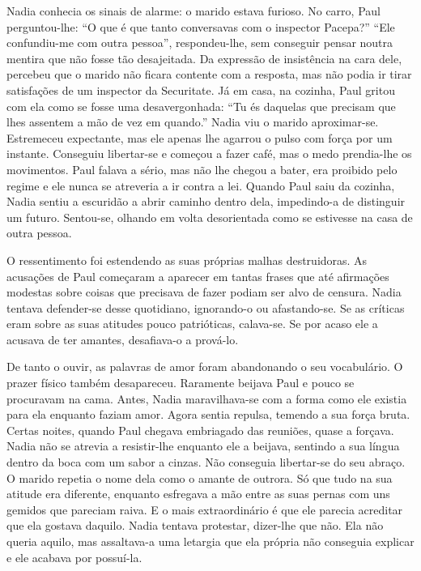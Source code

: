 Nadia conhecia os sinais de alarme: o marido estava furioso. No carro,
Paul perguntou-lhe: ``O que é que tanto conversavas com o inspector
Pacepa?'' ``Ele confundiu-me com outra pessoa'', respondeu-lhe, sem
conseguir pensar noutra mentira que não fosse tão desajeitada. Da
expressão de insistência na cara dele, percebeu que o marido não
ficara contente com a resposta, mas não podia ir tirar
satisfações de um inspector da Securitate. Já em casa, na cozinha, Paul
gritou com ela como se fosse uma desavergonhada: ``Tu és daquelas que
precisam que lhes assentem a mão de vez em quando.'' Nadia viu o marido
aproximar-se. Estremeceu expectante, mas ele apenas lhe agarrou o pulso com força
por um instante. Conseguiu libertar-se e começou a fazer café, mas o
medo prendia-lhe os movimentos. Paul falava a sério, mas não lhe
chegou a bater, era proibido pelo regime e ele nunca se atreveria a ir
contra a lei. Quando Paul saiu da cozinha, Nadia sentiu a escuridão a
abrir caminho dentro dela, impedindo-a de distinguir um futuro.
Sentou-se, olhando em volta desorientada como se estivesse na casa de
outra pessoa.

O ressentimento foi estendendo as suas próprias malhas destruidoras. As
acusações de Paul começaram a aparecer em tantas frases que até
afirmações modestas sobre coisas que precisava de fazer podiam ser alvo
de censura. Nadia tentava defender-se desse quotidiano, ignorando-o ou
afastando-se. Se as críticas eram sobre as suas atitudes pouco
patrióticas, calava-se. Se por acaso ele a acusava de ter amantes,
desafiava-o a prová-lo.

De tanto o ouvir, as palavras de amor foram abandonando o seu
vocabulário. O prazer físico também desapareceu. Raramente beijava
Paul e pouco se procuravam na cama. Antes, Nadia maravilhava-se com a
forma como ele existia para ela enquanto faziam amor. Agora sentia
repulsa, temendo a sua força bruta. Certas noites, quando Paul chegava
embriagado das reuniões, quase a forçava. Nadia não se atrevia a
resistir-lhe enquanto ele a beijava, sentindo a sua língua dentro da
boca com um sabor a cinzas. Não conseguia libertar-se do seu abraço. O marido repetia o nome
dela como o amante de outrora. Só que tudo na sua atitude era diferente,
enquanto esfregava a mão entre as suas pernas com uns gemidos que
pareciam raiva. E o mais extraordinário é que ele parecia acreditar que
ela gostava daquilo. Nadia tentava protestar, dizer-lhe que não. Ela não
queria aquilo, mas assaltava-a uma letargia que ela própria não
conseguia explicar e ele acabava por possuí-la.


